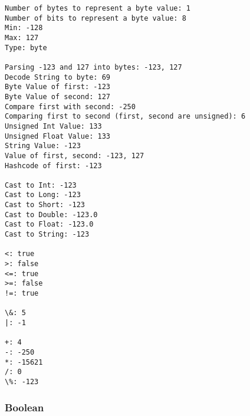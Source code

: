 \documentclass[9pt]{article}
\begin{document}
    \begin{Verbatim}[commandchars=\\\{\}]
Number of bytes to represent a byte value: 1
Number of bits to represent a byte value: 8
Min: -128
Max: 127
Type: byte

Parsing -123 and 127 into bytes: -123, 127
Decode String to byte: 69
Byte Value of first: -123
Byte Value of second: 127
Compare first with second: -250
Comparing first to second (first, second are unsigned): 6
Unsigned Int Value: 133
Unsigned Float Value: 133
String Value: -123
Value of first, second: -123, 127
Hashcode of first: -123

Cast to Int: -123
Cast to Long: -123
Cast to Short: -123
Cast to Double: -123.0
Cast to Float: -123.0
Cast to String: -123

<: true
>: false
<=: true
>=: false
!=: true

\&: 5
|: -1

+: 4
-: -250
*: -15621
/: 0
\%: -123
    \end{Verbatim}

    \hypertarget{boolean}{%
\subsubsection{Boolean}\label{boolean}}
\end{document}
